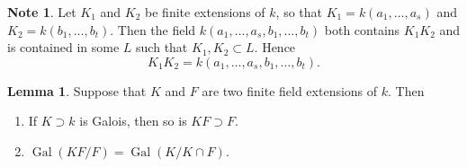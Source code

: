 \documentclass[10pt,letterpaper,cm]{nupset}
\theoremstyle{definition}
\newtheorem{note}{Note}
\newtheorem{lemma}{Lemma}
\newcommand{\1}{\mathbf{1}}
\newcommand{\0}{\vec 0}
\DeclareMathOperator{\gal}{Gal}
\begin{document}
\begin{note}
Let $K_1$ and $K_2$ be finite extensions of $k$, so that $K_1 = k(a_1, \ldots, a_s)$ and $K_2= k(b_1, \ldots, b_t)$. Then the field $k(a_1, \ldots, a_s, b_1, \ldots, b_t)$ both contains  $K_1K_2$ and is contained in some $L$ such that $K_1, K_2 \subset L$. Hence $$K_1K_2 =  k(a_1, \ldots, a_s, b_1, \ldots, b_t).$$ 
\end{note}

\begin{lemma}
Suppose that $K$ and $F$ are two finite field extensions of $k$. Then
\begin{enumerate}[label=(\alph*)]
\item If $K\supset k$ is Galois, then so is $KF\supset F$.
\item $\gal(KF/F) = \gal(K/ K \cap F)$.
\end{enumerate}
\end{lemma}
\end{document}
